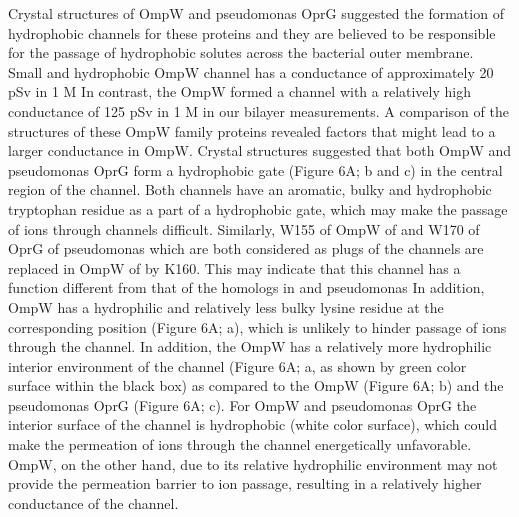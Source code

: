 Crystal structures of \ecoli OmpW and \ac{pseudomonas} OprG suggested the formation of hydrophobic channels for these proteins and they are believed to be responsible for the passage of hydrophobic solutes across the bacterial outer membrane. Small and hydrophobic \ecoli OmpW channel has a conductance of approximately 20 \si{\pico\sievert} in 1 M  In contrast, the \caulobacter OmpW formed a channel with a relatively high conductance of 125 \si{\pico\sievert} in 1 M  in our bilayer measurements. A comparison of the structures of these OmpW family proteins revealed factors that might lead to a larger conductance in \caulobacter OmpW. Crystal structures suggested that both \ecoli OmpW and \ac{pseudomonas} OprG form a hydrophobic gate (Figure 6A; b and c) in the central region of the channel. Both channels have an aromatic, bulky and hydrophobic tryptophan residue as a part of a hydrophobic gate, which may make the passage of ions through channels difficult. Similarly, W155 of OmpW of \ecoli{} and W170 of OprG of \ac{pseudomonas} which are both considered as plugs of the channels are replaced in OmpW of \caulobacter by K160. This may indicate that this channel has a function different from that of the homologs in \ecoli and \ac{pseudomonas} In addition, \caulobacter OmpW has a hydrophilic and relatively less bulky lysine residue at the corresponding position (Figure 6A; a), which is unlikely to hinder passage of ions through the channel. In addition, the \caulobacter OmpW has a relatively more hydrophilic interior environment of the channel (Figure 6A; a, as shown by green color surface within the black box) as compared to the \ecoli OmpW (Figure 6A; b) and the  \ac{pseudomonas} OprG (Figure 6A; c). For \ecoli OmpW and \ac{pseudomonas} OprG the interior surface of the channel is hydrophobic (white color surface), which could make the permeation of ions through the channel energetically unfavorable. \caulobacter OmpW, on the other hand, due to its relative hydrophilic environment may not provide the permeation barrier to ion passage, resulting in a relatively higher conductance of the channel. 

